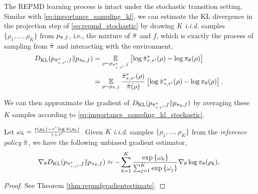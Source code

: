 The REPMD learning process is intact under the stochastic transition setting. Similar with \cref{eq:importance_sampling_kl}, we can estimate the KL divergence in the projection step of \cref{eq:repmd_stochastic} by drawing $K$ \textit{i.i.d.} samples $\{\rho_1, \dots, \rho_K\}$ from $p_{\bar{\pi}, f}$, i.e., the mixture of $\bar{\pi}$ and $f$, which is exactly the process of sampling from $\bar{\pi}$ and interacting with the environment,
\begin{equation}
\label{eq:importance_sampling_kl_stochastic}
\begin{split}
	D_{\mathrm{KL}}(p_{\bar{\pi}_{\tau,\tau^{\prime}}^*, f}  \| p_{\pi_\theta, f} ) &= \operatorname*{\mathbb{E}}_{\rho \sim p_{\bar{\pi}_{\tau,\tau^{\prime}}^*, f} } \left[ \log \bar{\pi}_{\tau,\tau^{\prime}}^*(\rho) - \log \pi_\theta(\rho) \right] \\
	&= \operatorname*{\mathbb{E}}_{\rho\sim p_{\bar{\pi}, f}} \frac{\bar{\pi}_{\tau,\tau^{\prime}}^*(\rho)}{\bar{\pi}(\rho)} \left[ \log \bar{\pi}_{\tau,\tau^{\prime}}^*(\rho) - \log \pi_\theta(\rho) \right].
\end{split}
\end{equation}

We can then approximate the gradient of $D_{\mathrm{KL}}(p_{\bar{\pi}_{\tau,\tau^{\prime}}^*, f}  \| p_{\pi_\theta, f} )$ by averaging these $K$ samples according to \cref{eq:importance_sampling_kl_stochastic}. 

\begin{thm}
\label{thm:repmdgradientestimate_stochastic}
Let $\omega_k = \frac{r(\rho_k) - \tau^{\prime} \log{\bar{\pi}(\rho_k)} }{\tau + \tau^{\prime}}$. Given $K$ \emph{i.i.d.} samples $\{\rho_1, \dots, \rho_K\}$ from the \emph{reference policy} $\bar{\pi}$, we have the following unbiased gradient estimator,
\begin{equation}
	\nabla_{\theta} D_{\mathrm{KL}}(p_{\bar{\pi}_{\tau,\tau^{\prime}}^*, f}  \| p_{\pi_\theta, f} ) \approx -\sum\limits_{k=1}^K{ \frac{ \exp\left\{ \omega_k \right\} }{ \sum_{j=1}^K{ \exp\left\{ \omega_j \right\}}} \nabla_{\theta} \log{\pi_\theta(\rho_k)} },
\end{equation}
\end{thm}
\begin{proof}
See Theorem \ref{thm:repmdgradientestimate}.
\end{proof}
